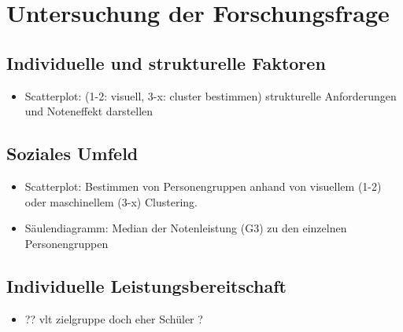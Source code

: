 \chapter[Untersuchung der Forschungsfrage]{Untersuchung der Forschungsfrage}

\section{Individuelle und strukturelle Faktoren}
\begin{itemize}
    \item Scatterplot: (1-2: visuell, 3-x: cluster bestimmen) strukturelle Anforderungen und Noteneffekt darstellen
\end{itemize}

\section{Soziales Umfeld}

\begin{itemize}
    \item Scatterplot: Bestimmen von Personengruppen anhand von visuellem (1-2) oder maschinellem (3-x) Clustering.
    \item Säulendiagramm: Median der Notenleistung (G3) zu den einzelnen Personengruppen
\end{itemize}

\section{Individuelle Leistungsbereitschaft}

\begin{itemize}
    \item ?? vlt zielgruppe doch eher Schüler ?
\end{itemize}